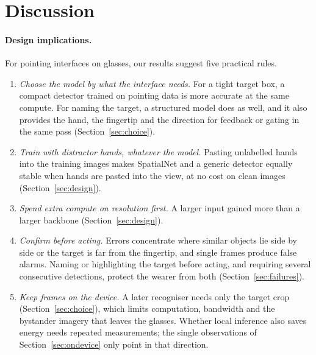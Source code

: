 \section{Discussion}\label{sec:discussion}

\paragraph{Design implications.} For pointing interfaces on glasses, our results suggest five practical rules.
\begin{enumerate}
\item \emph{Choose the model by what the interface needs.} For a tight target box, a compact detector trained on pointing data is more accurate at the same compute. For naming the target, a structured model does as well, and it also provides the hand, the fingertip and the direction for feedback or gating in the same pass (Section~\ref{sec:choice}).
\item \emph{Train with distractor hands, whatever the model.} Pasting unlabelled hands into the training images makes SpatialNet and a generic detector equally stable when hands are pasted into the view, at no cost on clean images (Section~\ref{sec:design}).
\item \emph{Spend extra compute on resolution first.} A larger input gained more than a larger backbone (Section~\ref{sec:design}).
\item \emph{Confirm before acting.} Errors concentrate where similar objects lie side by side or the target is far from the fingertip, and single frames produce false alarms. Naming or highlighting the target before acting, and requiring several consecutive detections, protect the wearer from both (Section~\ref{sec:failures}).
\item \emph{Keep frames on the device.} A later recogniser needs only the target crop (Section~\ref{sec:choice}), which limits computation, bandwidth and the bystander imagery that leaves the glasses. Whether local inference also saves energy needs repeated measurements; the single observations of Section~\ref{sec:ondevice} only point in that direction.
\end{enumerate}

